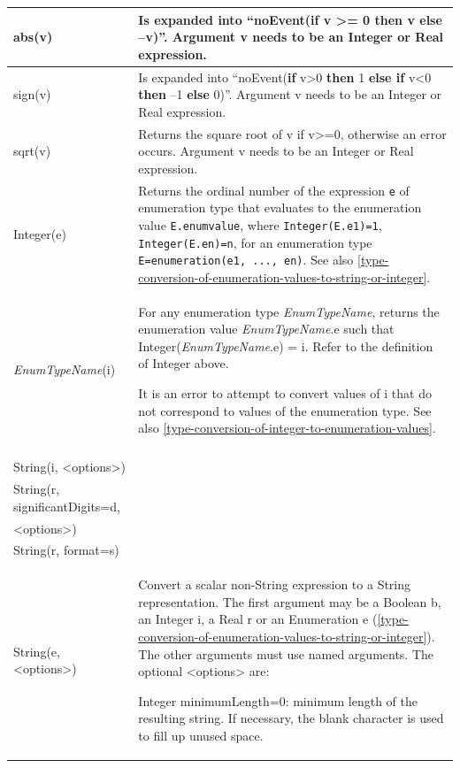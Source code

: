 \documentclass[10pt,a4paper]{report}
\begin{document}
\begin{longtable}{|p{4.5cm}|p{10.5cm}|} \hline
\endhead
abs(v) & Is expanded into ``noEvent(\textbf{if} v \textgreater{}= 0
\textbf{then} v \textbf{else} --v)''. Argument v needs to be an Integer
or Real expression.\\ \hline
sign(v) & Is expanded into ``noEvent(\textbf{if} v\textgreater{}0
\textbf{then} 1 \textbf{else if} v\textless{}0 \textbf{then} --1
\textbf{else} 0)''. Argument v needs to be an Integer or Real
expression.\\ \hline
sqrt(v) & Returns the square root of v if v\textgreater{}=0, otherwise
an error occurs. Argument v needs to be an Integer or Real
expression.\\ \hline
Integer(e) & Returns the ordinal number of the expression \lstinline!e! of
enumeration type that evaluates to the enumeration value \lstinline!E.enumvalue!,
where \lstinline!Integer(E.e1)=1!, \lstinline!Integer(E.en)=n!, for an enumeration type
\lstinline!E=enumeration(e1, ..., en)!. See also \ref{type-conversion-of-enumeration-values-to-string-or-integer}.\\ \hline
\emph{EnumTypeName}(i) & 
For any enumeration type \emph{EnumTypeName}, returns the enumeration
value \emph{EnumTypeName}.e such that Integer(\emph{EnumTypeName}.e) =
i. Refer to the definition of Integer above.

It is an error to attempt to convert values of i that do not correspond
to values of the enumeration type. See also \ref{type-conversion-of-integer-to-enumeration-values}.
\\ \hline
\begin{tabular}{@{}p{4.5cm}@{}}
String(b, \textless{}options\textgreater{})\\
String(i, \textless{}options\textgreater{})\\
String(r,
significantDigits=d,\\
\textless{}options\textgreater{})\\
String(r, format=s)\\
String(e, \textless{}options\textgreater{})
\end{tabular} & Convert a scalar non-String expression to a String representation. The
first argument may be a Boolean b, an Integer i, a Real r or an
Enumeration e (\ref{type-conversion-of-enumeration-values-to-string-or-integer}). The other arguments must use named
arguments. The optional \textless{}options\textgreater{} are:

Integer minimumLength=0: minimum length of the resulting string. If
necessary, the blank character is used to fill up unused space.


\end{longtable}
\end{document}
